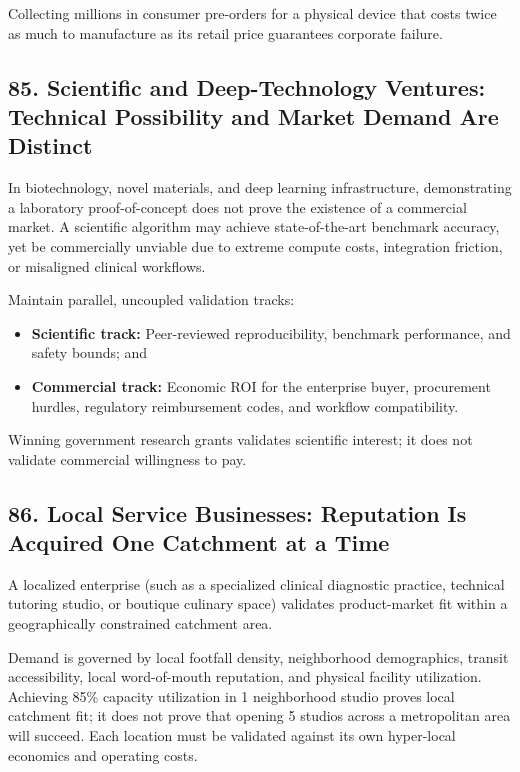 Collecting millions in consumer pre-orders for a physical device that costs twice as much to manufacture as its retail price guarantees corporate failure.

\subsection*{85. Scientific and Deep-Technology Ventures: Technical Possibility and Market Demand Are Distinct}

In biotechnology, novel materials, and deep learning infrastructure, demonstrating a laboratory proof-of-concept does not prove the existence of a commercial market. A scientific algorithm may achieve state-of-the-art benchmark accuracy, yet be commercially unviable due to extreme compute costs, integration friction, or misaligned clinical workflows.

Maintain parallel, uncoupled validation tracks:
\begin{itemize}
    \item \textbf{Scientific track:} Peer-reviewed reproducibility, benchmark performance, and safety bounds; and
    \item \textbf{Commercial track:} Economic ROI for the enterprise buyer, procurement hurdles, regulatory reimbursement codes, and workflow compatibility.
\end{itemize}

Winning government research grants validates scientific interest; it does not validate commercial willingness to pay.

\subsection*{86. Local Service Businesses: Reputation Is Acquired One Catchment at a Time}

A localized enterprise (such as a specialized clinical diagnostic practice, technical tutoring studio, or boutique culinary space) validates product-market fit within a geographically constrained catchment area.

Demand is governed by local footfall density, neighborhood demographics, transit accessibility, local word-of-mouth reputation, and physical facility utilization. Achieving 85\% capacity utilization in 1 neighborhood studio proves local catchment fit; it does not prove that opening 5 studios across a metropolitan area will succeed. Each location must be validated against its own hyper-local economics and operating costs.

